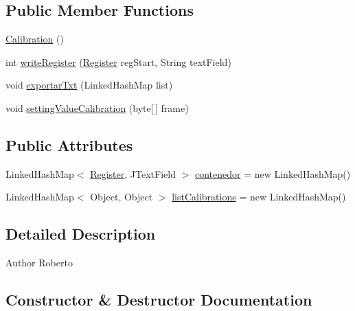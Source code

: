 \subsection*{Public Member Functions}
\begin{DoxyCompactItemize}
\item 
\hyperlink{classcom_1_1eneri_1_1scorpio__metertool_1_1ui_1_1_calibration_a538088f4b75599c15a7a7785a2a7c218}{Calibration} ()
\item 
int \hyperlink{classcom_1_1eneri_1_1scorpio__metertool_1_1ui_1_1_calibration_a4c07ea2d219da99d81df8bc870d89668}{write\+Register} (\hyperlink{enumcom_1_1eneri_1_1scorpio__metertool_1_1devices_1_1_register}{Register} reg\+Start, String text\+Field)
\item 
void \hyperlink{classcom_1_1eneri_1_1scorpio__metertool_1_1ui_1_1_calibration_ade0f630292b228b7527b4bdaf708d048}{exportar\+Txt} (Linked\+Hash\+Map list)
\item 
void \hyperlink{classcom_1_1eneri_1_1scorpio__metertool_1_1ui_1_1_calibration_aa03f028e4ff892cb0528fd7a14468f94}{setting\+Value\+Calibration} (byte\mbox{[}$\,$\mbox{]} frame)
\end{DoxyCompactItemize}
\subsection*{Public Attributes}
\begin{DoxyCompactItemize}
\item 
Linked\+Hash\+Map$<$ \hyperlink{enumcom_1_1eneri_1_1scorpio__metertool_1_1devices_1_1_register}{Register}, J\+Text\+Field $>$ \hyperlink{classcom_1_1eneri_1_1scorpio__metertool_1_1ui_1_1_calibration_a4a42a8a38044060de5a6aef87c3b6291}{contenedor} = new Linked\+Hash\+Map()
\item 
Linked\+Hash\+Map$<$ Object, Object $>$ \hyperlink{classcom_1_1eneri_1_1scorpio__metertool_1_1ui_1_1_calibration_a20342fc3ea4fb62c0d55eca5d5833250}{list\+Calibrations} = new Linked\+Hash\+Map()
\end{DoxyCompactItemize}


\subsection{Detailed Description}
\begin{DoxyAuthor}{Author}
Roberto 
\end{DoxyAuthor}


\subsection{Constructor \& Destructor Documentation}
\mbox{\label{classcom_1_1eneri_1_1scorpio__metertool_1_1ui_1_1_calibration_a538088f4b75599c15a7a7785a2a7c218}} 
